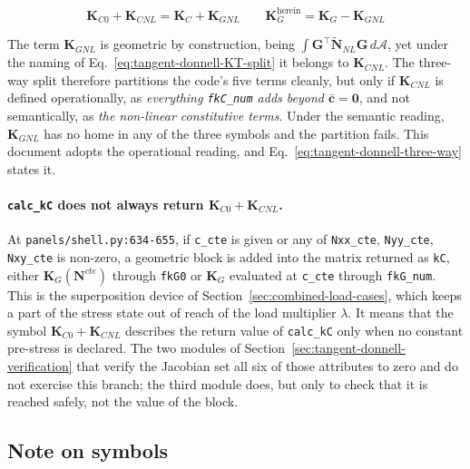 \begin{equation}\label{eq:tangent-donnell-boundary}
	\boldsymbol{K}_{C0} + \boldsymbol{K}_{CNL} = \boldsymbol{K}_C + \boldsymbol{K}_{GNL}
	\qquad
	\boldsymbol{K}_G^{\text{herein}} = \boldsymbol{K}_G - \boldsymbol{K}_{GNL}
\end{equation}

The term $\boldsymbol{K}_{GNL}$ is geometric by construction, being $\int \boldsymbol{G}^\top \tilde{\boldsymbol{N}}_{NL} \boldsymbol{G} \, d\mathcal{A}$, yet under the naming of Eq.~\ref{eq:tangent-donnell-KT-split} it belongs to $\boldsymbol{K}_{CNL}$. The three-way split therefore partitions the code's five terms cleanly, but only if $\boldsymbol{K}_{CNL}$ is defined operationally, as \emph{everything \texttt{fkC\_num} adds beyond $\bar{\boldsymbol{c}} = \boldsymbol{0}$}, and not semantically, as \emph{the non-linear constitutive terms}. Under the semantic reading, $\boldsymbol{K}_{GNL}$ has no home in any of the three symbols and the partition fails. This document adopts the operational reading, and Eq.~\ref{eq:tangent-donnell-three-way} states it.

\paragraph{\texttt{calc\_kC} does not always return $\boldsymbol{K}_{C0} + \boldsymbol{K}_{CNL}$.} At \texttt{panels/shell.py:634-655}, if \texttt{c\_cte} is given or any of \texttt{Nxx\_cte}, \texttt{Nyy\_cte}, \texttt{Nxy\_cte} is non-zero, a geometric block is added into the matrix returned as \texttt{kC}, either $\boldsymbol{K}_G(\boldsymbol{N}^{cte})$ through \texttt{fkG0} or $\boldsymbol{K}_G$ evaluated at \texttt{c\_cte} through \texttt{fkG\_num}. This is the superposition device of Section~\ref{sec:combined-load-cases}, which keeps a part of the stress state out of reach of the load multiplier $\lambda$. It means that the symbol $\boldsymbol{K}_{C0} + \boldsymbol{K}_{CNL}$ describes the return value of \texttt{calc\_kC} only when no constant pre-stress is declared. The two modules of Section~\ref{sec:tangent-donnell-verification} that verify the Jacobian set all six of those attributes to zero and do not exercise this branch; the third module does, but only to check that it is reached safely, not the value of the block.

\subsection*{Note on symbols}

